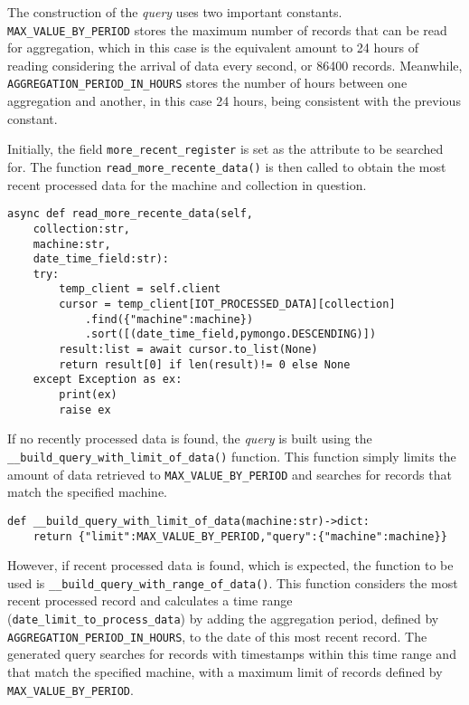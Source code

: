 The construction of the \textit{query} uses two important constants. \texttt{MAX\_VALUE\_BY\_PERIOD} stores the maximum number of records that can be read for aggregation, which in this case is the equivalent amount to 24 hours of reading considering the arrival of data every second, or 86400 records. Meanwhile, \texttt{AGGREGATION\_PERIOD\_IN\_HOURS} stores the number of hours between one aggregation and another, in this case 24 hours, being consistent with the previous constant.

Initially, the field \texttt{more\_recent\_register} is set as the attribute to be searched for. The function \texttt{read\_more\_recente\_data()} is then called to obtain the most recent processed data for the machine and collection in question.

\begin{Verbatim}[fontsize=\small, baselinestretch=0.8]
async def read_more_recente_data(self,
    collection:str,
    machine:str,
    date_time_field:str):
    try:
        temp_client = self.client
        cursor = temp_client[IOT_PROCESSED_DATA][collection]
            .find({"machine":machine})
            .sort([(date_time_field,pymongo.DESCENDING)])
        result:list = await cursor.to_list(None)
        return result[0] if len(result)!= 0 else None
    except Exception as ex:
        print(ex)
        raise ex
\end{Verbatim}

If no recently processed data is found, the \textit{query} is built using the \texttt{\_\_build\_query\_with\_limit\_of\_data()} function. This function simply limits the amount of data retrieved to \texttt{MAX\_VALUE\_BY\_PERIOD} and searches for records that match the specified machine.

\begin{Verbatim}[fontsize=\small, baselinestretch=0.8]
def __build_query_with_limit_of_data(machine:str)->dict:
    return {"limit":MAX_VALUE_BY_PERIOD,"query":{"machine":machine}}
\end{Verbatim}


However, if recent processed data is found, which is expected, the function to be used is \texttt{\_\_build\_query\_with\_range\_of\_data()}. This function considers the most recent processed record and calculates a time range (\texttt{date\_limit\_to\_process\_data}) by adding the aggregation period, defined by \texttt{AGGREGATION\_PERIOD\_IN\_HOURS}, to the date of this most recent record. The generated query searches for records with timestamps within this time range and that match the specified machine, with a maximum limit of
records defined by \texttt{MAX\_VALUE\_BY\_PERIOD}.

